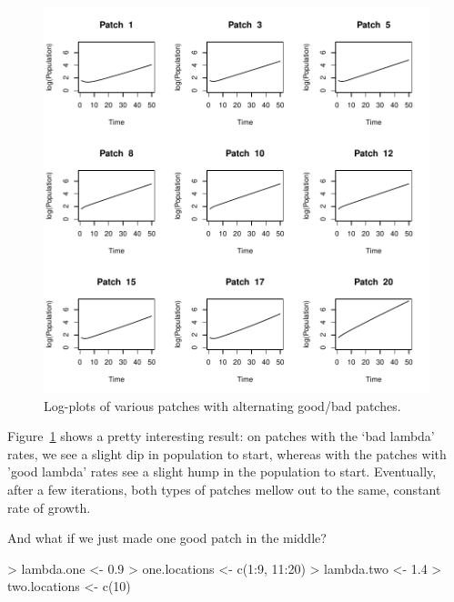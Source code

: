 \documentclass[10pt, oneside, reqno]{article}
\theoremstyle{plain}
\begin{document}
\begin{figure}
\begin{center}
\includegraphics{spa1_tn248-popplot2}
\end{center}
\caption{Log-plots of various patches with alternating good/bad patches.}
\label{fig:popplot2}
\end{figure}

Figure~\ref{fig:popplot2} shows a pretty interesting result: on patches with the `bad lambda' rates, we see a slight dip in population to start, whereas with the patches with 'good lambda' rates see a slight hump in the population to start. Eventually, after a few iterations, both types of patches mellow out to the same, constant rate of growth. 

And what if we just made one good patch in the middle?

\begin{Schunk}
\begin{Sinput}
> lambda.one <- 0.9
> one.locations <- c(1:9, 11:20)
> lambda.two <- 1.4
> two.locations <- c(10)
\end{Sinput}
\end{Schunk}
\end{document}
